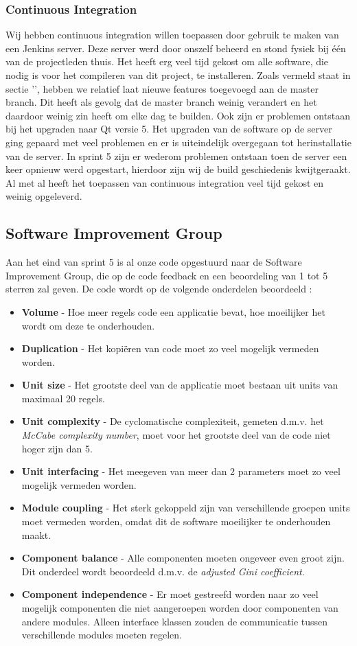 \subsubsection{Continuous Integration}
Wij hebben continuous integration willen toepassen door gebruik te maken van een Jenkins server. Deze server werd door onszelf beheerd en stond fysiek bij \'e\'en van de projectleden thuis. Het heeft erg veel tijd gekost om alle software, die nodig is voor het compileren van dit project, te installeren. Zoals vermeld staat in sectie '', hebben we relatief laat nieuwe features toegevoegd aan de master branch. Dit heeft als gevolg dat de master branch weinig verandert en het daardoor weinig zin heeft om elke dag te builden. Ook zijn er problemen ontstaan bij het upgraden naar Qt versie 5. Het upgraden van de software op de server ging gepaard met veel problemen en er is uiteindelijk overgegaan tot herinstallatie van de server. In sprint 5 zijn er wederom problemen ontstaan toen de server een keer opnieuw werd opgestart, hierdoor zijn wij de build geschiedenis kwijtgeraakt. Al met al heeft het toepassen van continuous integration veel tijd gekost en weinig opgeleverd. 

\subsection{Software Improvement Group}

Aan het eind van sprint 5 is al onze code opgestuurd naar de Software Improvement Group, die op de code feedback en een beoordeling van 1 tot 5 sterren zal geven. De code wordt op de volgende onderdelen beoordeeld \cite{sigmanual}:
\begin{itemize}
\item \textbf{Volume} - Hoe meer regels code een applicatie bevat, hoe moeilijker het wordt om deze te onderhouden.
\item \textbf{Duplication} - Het kopi\"eren van code moet zo veel mogelijk vermeden worden.
\item \textbf{Unit size} - Het grootste deel van de applicatie moet bestaan uit units van maximaal 20 regels.
\item \textbf{Unit complexity} - De cyclomatische complexiteit, gemeten d.m.v. het \emph{McCabe complexity number}, moet voor het grootste deel van de code niet hoger zijn dan 5.
\item \textbf{Unit interfacing} - Het meegeven van meer dan 2 parameters moet zo veel mogelijk vermeden worden.
\item \textbf{Module coupling} - Het sterk gekoppeld zijn van verschillende groepen units moet vermeden worden, omdat dit de software moeilijker te onderhouden maakt.
\item \textbf{Component balance} - Alle componenten moeten ongeveer even groot zijn. Dit onderdeel wordt beoordeeld d.m.v. de \emph{adjusted Gini coefficient}.
\item \textbf{Component independence} - Er moet gestreefd worden naar zo veel mogelijk componenten die niet aangeroepen worden door componenten van andere modules. Alleen interface klassen zouden de communicatie tussen verschillende modules moeten regelen.
\end{itemize}

